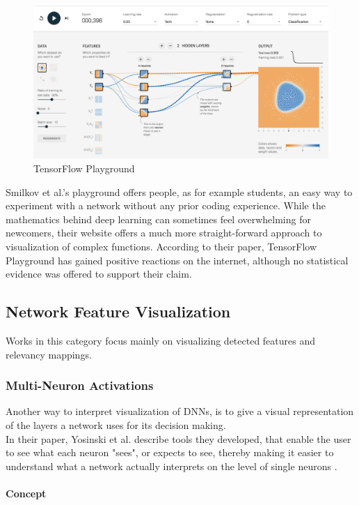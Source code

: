 \documentclass{acmsiggraph}               %
\newcommand{\paragraphbr}[1]{\paragraph{#1}\mbox{}\\}
\begin{document}
\begin{figure}
\includegraphics[width=\textwidth]{tensorflow_playground_smilkov_et_al}
\caption{TensorFlow Playground \protect\cite{Smilkov2017}}
\label{fig:tensorflow_playground}
\centering
\end{figure}

Smilkov et al.'s playground offers people, as for example students, an easy way to experiment with a network without any prior coding experience. While the mathematics behind deep learning can sometimes feel overwhelming for newcomers, their website offers a much more straight-forward approach to visualization of complex functions. According to their paper, TensorFlow Playground has gained positive reactions on the internet, although no statistical evidence was offered to support their claim.

\subsection{Network Feature Visualization}
Works in this category focus mainly on visualizing detected features and relevancy mappings.

\subsubsection{Multi-Neuron Activations}
Another way to interpret visualization of DNNs, is to give a visual representation of the layers a network uses for its decision making.\\ 
In their paper, Yosinski et al. describe tools they developed, that enable the user to see what each neuron "sees", or expects to see, thereby making it easier to understand what a network actually interprets on the level of single neurons \cite{Yosinski2015}.

\paragraphbr{Concept}
\end{document}
